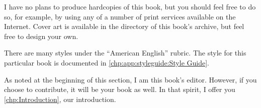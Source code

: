I have no plans to produce hardcopies of this book, but you should
feel free to do so, for example, by using any of a number of print
services available on the Internet.
Cover art is available in the  directory of this
book's  archive, but feel free to design your own.

There are many styles under the ``American English'' rubric.
The style for this particular book is documented in
\cref{chp:app:styleguide:Style Guide}.

As noted at the beginning of this section, I am this book's editor.
However, if you choose to contribute, it will be your book as well.
In that spirit, I offer you \cref{chp:Introduction}, our introduction.

